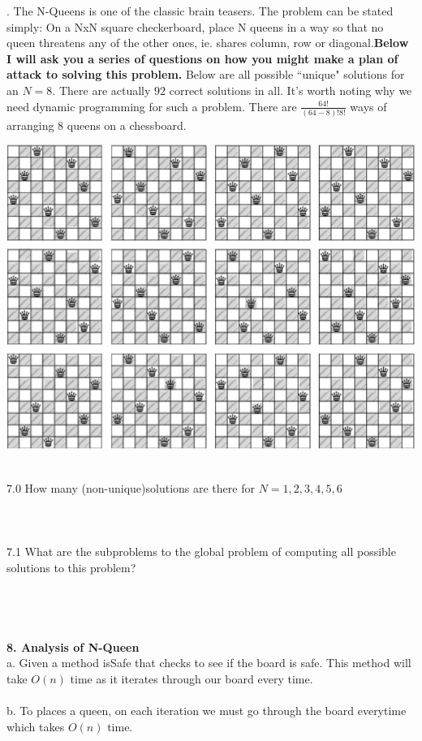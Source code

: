\documentclass[12pt]{article}
\begin{document}
\newpage
{}. The N-Queens is one of the classic brain teasers. The problem can be stated simply:
On a NxN square checkerboard, place N queens in a way so that no queen threatens any 
of the other ones, ie. shares column, row or diagonal.\textbf{Below I will ask you a series of questions 
on how you might make a plan of attack to solving this problem.} Below are all possible ``unique" solutions
for an $N=8$. There are actually $92$ correct solutions in all. It's worth noting why we need dynamic
programming for such a problem. There are $\frac{64!}{(64-8)!8!}$ ways of arranging $8$ queens on a
chessboard.
\centerline{\includegraphics[scale = .25]{queen.jpg}}\\
7.0 How many (non-unique)solutions are there for $N = 1,2,3,4,5,6$\\\\\\\\
7.1 What are the subproblems to the global problem of computing all possible solutions to this problem?\\\\\\\\\\
\newpage
\noindent \textbf{8. Analysis of N-Queen}\\
a. Given a method isSafe that checks to see if the board is safe. This method
will take $O(n)$ time as it iterates through our board every time.\\\\
b. To places a queen, on each iteration we must go through the board everytime which takes $O(n)$ time.\\\\
\end{document}
